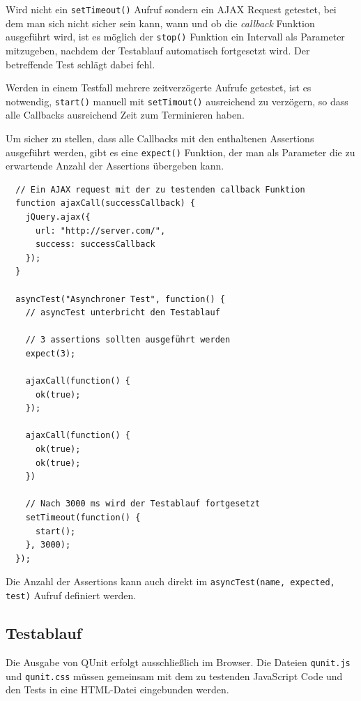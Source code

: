 \documentclass[11pt, a4paper]{article}
\begin{document}
Wird nicht ein \texttt{setTimeout()} Aufruf sondern ein AJAX Request
getestet, bei dem man sich nicht sicher sein kann, wann und ob die
\emph{callback} Funktion ausgeführt wird, ist es möglich der \texttt{stop()}
Funktion ein Intervall als Parameter mitzugeben, nachdem der Testablauf
automatisch fortgesetzt wird. Der betreffende Test schlägt dabei fehl.

Werden in einem Testfall mehrere zeitverzögerte Aufrufe getestet, ist es
notwendig, \texttt{start()} manuell mit \texttt{setTimout()} ausreichend zu
verzögern, so dass alle Callbacks ausreichend Zeit zum Terminieren haben.

Um sicher zu stellen, dass alle Callbacks mit den enthaltenen
Assertions ausgeführt werden, gibt es eine \texttt{expect()} Funktion,
der man als Parameter die zu erwartende Anzahl der Assertions übergeben
kann.

\begin{verbatim}
  // Ein AJAX request mit der zu testenden callback Funktion
  function ajaxCall(successCallback) {
    jQuery.ajax({
      url: "http://server.com/",
      success: successCallback
    });
  }

  asyncTest("Asynchroner Test", function() {
    // asyncTest unterbricht den Testablauf

    // 3 assertions sollten ausgeführt werden
    expect(3);

    ajaxCall(function() {
      ok(true);
    });

    ajaxCall(function() {
      ok(true);
      ok(true);
    })

    // Nach 3000 ms wird der Testablauf fortgesetzt
    setTimeout(function() {
      start();
    }, 3000);
  });
\end{verbatim}

Die Anzahl der Assertions kann auch direkt im \texttt{asyncTest(name, expected,
test)} Aufruf definiert werden.

\clearpage

\subsection{Testablauf}

Die Ausgabe von QUnit erfolgt ausschließlich im Browser. Die Da\-tei\-en
\texttt{qunit.js} und \texttt{qunit.css} müssen gemeinsam mit dem zu testenden
JavaScript Code und den Tests in eine HTML-Datei eingebunden werden.
\end{document}
